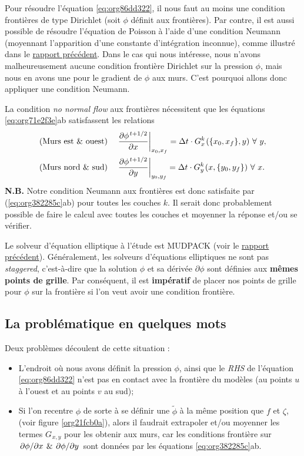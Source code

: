 \documentclass[10pt]{article}
\numberwithin{equation}{section}
\newcommand{\pt}{\hspace{1pt}} %
\begin{document}
Pour résoudre l'équation \ref{eq:org86dd322}, il nous faut au moins une condition frontières de type Dirichlet (soit \(\phi\) définit aux frontières).
Par contre, il est aussi possible de résoudre l'équation de Poisson à l'aide d'une condition Neumann (moyennant l'apparition d'une constante d'intégration inconnue), comme illustré dans le \href{rapport-2023-04-21.org}{rapport précédent}.
Dans le cas qui nous intéresse, nous n'avons malheureusement aucune condition frontière Dirichlet sur la pression \(\phi\), mais nous en avons une pour le gradient de \(\phi\) aux murs.
C'est pourquoi allons donc appliquer une condition Neumann.\bigskip

La condition \emph{no normal flow} aux frontières nécessitent que les équations \ref{eq:org71e2f3e}ab satisfassent les relations
\begin{subequations}
\label{eq:org382285c}
\begin{align}
&& &\text{(Murs est \& ouest)}
&&\eval{\pdv{\phi^{\pt t+1/2}}{x}}_{x_0,x_f} =  \Delta t\cdot G^k_x\pt (\{x_0,x_f\},y)\ \forall\ y,&&\\
&& &\text{(Murs nord \& sud)}
&&\eval{\pdv{\phi^{\pt t+1/2}}{y}}_{y_0,y_f} =  \Delta t\cdot G^k_y\pt (x,\{y_0,y_f\})\ \forall\ x.&&
\end{align}
\end{subequations}
\textbf{N.B.} Notre condition Neumann aux frontières est donc satisfaite par (\ref{eq:org382285c}ab) pour toutes les couches \(k\).
Il serait donc probablement possible de faire le calcul avec toutes les couches et moyenner la réponse et/ou se vérifier.\bigskip

Le solveur d'équation elliptique à l'étude est MUDPACK (voir le \href{rapport-2023-04-21.org}{rapport précédent}).
Généralement, les solveurs d'équations elliptiques ne sont pas \emph{staggered}, c'est-à-dire que la solution \(\phi\) et sa dérivée \(\partial\phi\) sont définies aux \textbf{mêmes points de grille}.
Par conséquent, il est \textbf{impératif} de placer nos points de grille pour \(\phi\) sur la frontière si l'on veut avoir une condition frontière.
\subsection{La problématique en quelques mots}
\label{sec:org61c62ad}

Deux problèmes découlent de cette situation :
\begin{itemize}
\item L'endroit où nous avons définit la pression \(\phi\), ainsi que le \emph{RHS} de l'équation \ref{eq:org86dd322} n'est pas en contact avec la frontière du modèles (au points \(u\) à l'ouest et au points \(v\) au sud);
\item Si l'on recentre \(\phi\) de sorte à se définir une \(\tilde{\phi}\) à la même position que \(f\) et \(\zeta\), (voir figure \ref{org21fcb0a}), alors il faudrait extrapoler et/ou moyenner les termes \(G_{\pt x,y}\) pour les obtenir aux murs, car les conditions frontière sur \(\pdv*{\phi}{x}\pt \& \pt \pdv*{\phi}{y}\) sont données par les équations \ref{eq:org382285c}ab.
\end{itemize}
\end{document}

